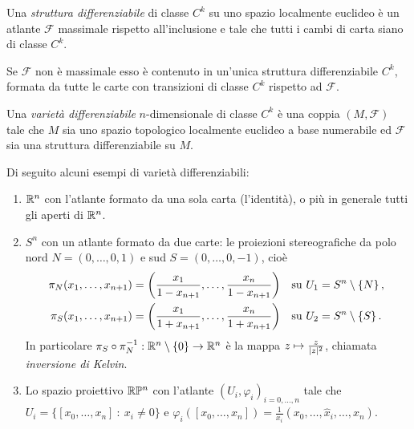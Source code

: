  
 \begin{definition} 
 Una \emph{struttura differenziabile} di classe $C^k$ su uno
 spazio localmente euclideo è un atlante $\mathcal F$ massimale rispetto all'inclusione e tale che tutti i cambi di carta siano
 di classe $C^k$.
 \end{definition}
 
 \begin{remark}
  Se $\mathcal F$ non è massimale esso è contenuto in un'unica struttura differenziabile $C^k$,
  formata da tutte le carte con transizioni di classe $C^k$ rispetto ad $\mathcal F$.
 \end{remark}
 
 \begin{definition} 
  Una \emph{varietà differenziabile} $n$-dimensionale di classe $C^k$ è una coppia $(M, \mathcal F)$ tale che $M$ sia uno spazio topologico localmente euclideo a base numerabile ed $\mathcal F$ sia una struttura differenziabile su $M$.
 \end{definition}
 
\begin{example}
	Di seguito alcuni esempi di varietà differenziabili: 
	\begin{enumerate}
	\item $\mathbb R^n$ con l'atlante formato da una sola carta (l'identità), o più in generale tutti gli aperti di $\mathbb R^n$.
	\item $S^n$ con un atlante formato da due carte: le proiezioni stereografiche da polo nord $N=(0,\ldots,0,1)$ e sud $S=(0,\ldots,0,-1)$, cioè  \label{example:ProiezioniStereografiche}
	\begin{align*}
		\pi_N(x_1,\ldots,x_{n+1}) = \left( \frac{x_1}{1-x_{n+1}},\ldots,\frac{x_n}{1-x_{n+1}} \right) &\quad \text{su $U_1=S^n\setminus \{N\}$} \, \text{, }\\
		\pi_S(x_1,\ldots,x_{n+1}) = \left( \frac{x_1}{1+x_{n+1}},\ldots,\frac{x_n}{1+x_{n+1}} \right) &\quad \text{su $U_2=S^n\setminus \{S\}$} \, \text{. }
	\end{align*}
	In particolare $\pi_S\circ \pi_N^{-1}:\mathbb R^n\setminus\{0\} \to \mathbb R^n$ è la mappa $z\mapsto \frac z{\lvert z\rvert^2}$, chiamata \emph{inversione di Kelvin}.

   \item Lo spazio proiettivo $\mathbb R\mathbb P^n$ con l'atlante $(U_i,\varphi_i)_{i=0,\dots,n}$ tale che $U_i=\{ [x_0,\dots,x_n]\ :\ x_i\neq 0\}$ e $\varphi_i([x_0,\dots,x_n])=\frac 1{x_i}(x_0,\dots,\hat x_i,\dots,x_n)$.
  \end{enumerate}
 \end{example}
 
